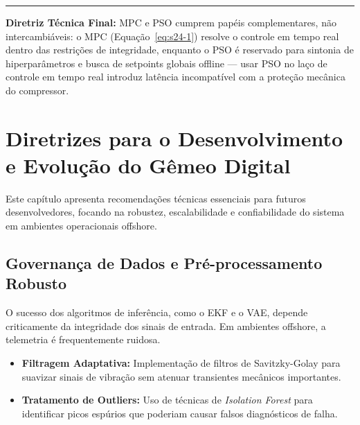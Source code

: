 \documentclass[12pt,a4paper]{article}
\numberwithin{equation}{section}
\numberwithin{table}{section}
\numberwithin{figure}{section}
\begin{document}
	\vspace{1em}
	\hrule
	\vspace{1em}

	\textbf{Diretriz Técnica Final:} MPC e PSO cumprem papéis complementares, não intercambiáveis: o MPC (Equação~\eqref{eq:s24-1}) resolve o controle em tempo real dentro das restrições de integridade, enquanto o PSO é reservado para sintonia de hiperparâmetros e busca de setpoints globais offline — usar PSO no laço de controle em tempo real introduz latência incompatível com a proteção mecânica do compressor.

	\section{Diretrizes para o Desenvolvimento e Evolução do Gêmeo Digital}
	
	Este capítulo apresenta recomendações técnicas essenciais para futuros desenvolvedores, focando na robustez, escalabilidade e confiabilidade do sistema em ambientes operacionais offshore.
	
	\subsection{Governança de Dados e Pré-processamento Robusto}
	O sucesso dos algoritmos de inferência, como o EKF e o VAE, depende criticamente da integridade dos sinais de entrada. Em ambientes offshore, a telemetria é frequentemente ruidosa.
	\begin{itemize}
		\item \textbf{Filtragem Adaptativa:} Implementação de filtros de Savitzky-Golay para suavizar sinais de vibração sem atenuar transientes mecânicos importantes.
		\item \textbf{Tratamento de Outliers:} Uso de técnicas de \textit{Isolation Forest} para identificar picos espúrios que poderiam causar falsos diagnósticos de falha.
	\end{itemize}
	
\end{document}
